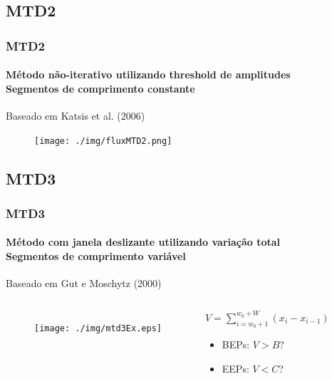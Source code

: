 \documentclass{beamer}
\begin{document}
	\subsection[MTD2]{MTD2}
	\begin{frame}
		\frametitle{MTD2}
		\framesubtitle{Método não-iterativo utilizando threshold de amplitudes \\ Segmentos de comprimento constante}
		
		Baseado em Katsis et al. (2006)
			
		\begin{figure}
			\begin{center}
				\texttt{[image: ./img/fluxMTD2.png]}
			\end{center}
		\end{figure}

	\end{frame}
	
	\subsection[MTD3]{MTD3}
	\begin{frame}
		\frametitle{MTD3}
		\framesubtitle{Método com janela deslizante utilizando variação total \\ Segmentos de comprimento variável}
		
		Baseado em Gut e Moschytz (2000)
		
		\begin{columns}[c]
			
				\begin{figure}
					\begin{center}
						\texttt{[image: ./img/mtd3Ex.eps]}
					\end{center}
				\end{figure}
		
				\begin{exampleblock}{$V = \sum\limits_{i=w_0+1}^{w_0+W} (x_i - x_{i-1})$}
					\begin{itemize}
						\item BEPs: $V > B$?
						\item EEPs: $V < C$?
					\end{itemize}
				\end{exampleblock}
		\end{columns}
		
	\end{frame}
	
%		
	
\end{document}
